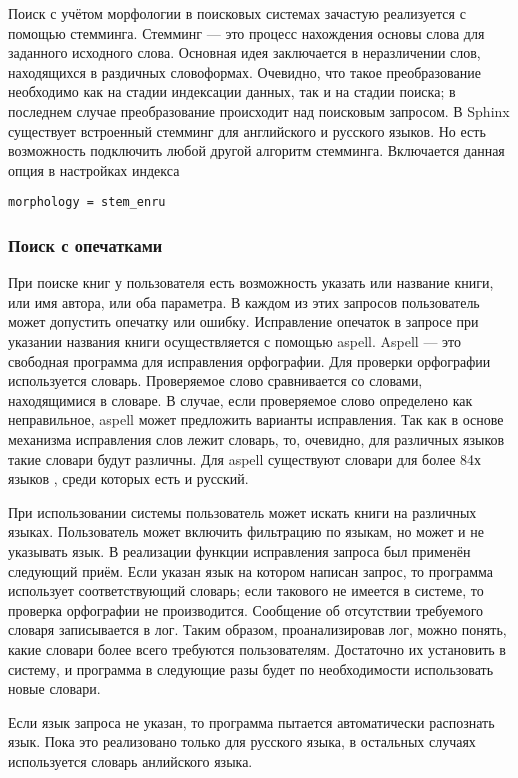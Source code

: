 Поиск с учётом морфологии в поисковых системах зачастую реализуется с помощью стемминга. Стемминг \cite{stemming} --- это процесс нахождения основы слова для заданного исходного слова.
Основная идея заключается в неразличении слов, находящихся в раздичных словоформах.
Очевидно, что такое преобразование необходимо как на стадии индексации данных, так и на стадии поиска; в последнем случае преобразование происходит над поисковым запросом.
В Sphinx существует встроенный стемминг для английского и русского языков.
Но есть возможность подключить любой другой алгоритм стемминга.
Включается данная опция в настройках индекса
\begin{verbatim}
morphology = stem_enru
\end{verbatim}
\subsubsection{Поиск с опечатками}

При поиске книг у пользователя есть возможность указать или название книги, или имя автора, или оба параметра. В каждом из этих запросов пользователь может допустить опечатку или ошибку.
Исправление опечаток в запросе при указании названия книги осуществляется с помощью aspell. 
Aspell \cite{aspell} --- это свободная программа для исправления орфографии.
Для проверки орфографии используется словарь. 
Проверяемое слово сравнивается со словами, находящимися в словаре.
В случае, если проверяемое слово определено как неправильное, aspell может предложить варианты исправления. Так как в основе механизма исправления слов лежит словарь, то, очевидно, для различных языков такие словари будут различны. Для aspell существуют словари для более 84х языков \cite{langforaspell},
среди которых есть и русский.

При использовании системы пользователь может искать книги на различных языках. Пользователь может включить фильтрацию по языкам, но может и не указывать язык.
В реализации функции исправления запроса был применён следующий приём.
Если указан язык на котором написан запрос, то программа использует соответствующий словарь; если такового не имеется в системе, то проверка орфографии не производится. Сообщение об отсутствии требуемого словаря записывается в лог.
Таким образом, проанализировав лог, можно понять, какие словари более всего требуются пользователям. Достаточно их установить в систему, и программа в следующие разы будет по необходимости использовать новые словари.

Если язык запроса не указан, то программа пытается автоматически распознать язык.
Пока это реализовано только для русского языка, в остальных случаях используется словарь анлийского языка.

